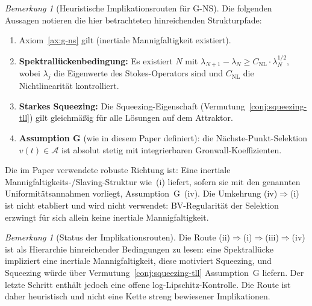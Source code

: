 \documentclass[12pt,a4paper]{article}
\theoremstyle{definition}
\theoremstyle{plain}
\theoremstyle{remark}
\newtheorem{remark}[definition]{Bemerkung}
\begin{document}
\begin{remark}[Heuristische Implikationsrouten f\"ur G-NS]\label{prop:g-equivalences}
Die folgenden Aussagen notieren die hier betrachteten hinreichenden Strukturpfade:
\begin{enumerate}
\item[(i)] Axiom~\ref{ax:g-ns} gilt (inertiale Mannigfaltigkeit existiert).
\item[(ii)] \textbf{Spektrall\"uckenbedingung:} Es existiert $N$ mit $\lambda_{N+1} - \lambda_N \geq C_{\mathrm{NL}} \cdot \lambda_N^{1/2}$, wobei $\lambda_j$ die Eigenwerte des Stokes-Operators sind und $C_{\mathrm{NL}}$ die Nichtlinearit\"at kontrolliert.
\item[(iii)] \textbf{Starkes Squeezing:} Die Squeezing-Eigenschaft (Vermutung~\ref{conj:squeezing-tll}) gilt gleichm\"a\ss ig f\"ur alle L\"osungen auf dem Attraktor.
\item[(iv)] \textbf{Assumption G} (wie in diesem Paper definiert): die N\"achste-Punkt-Selektion $v(t) \in \mathcal{A}$ ist absolut stetig mit integrierbaren Gronwall-Koeffizienten.
\end{enumerate}
Die im Paper verwendete robuste Richtung ist: Eine inertiale Mannigfaltigkeits-/Slaving-Struktur wie~(i) liefert, sofern sie mit den genannten Uniformit\"atsannahmen vorliegt, Assumption~G~(iv). Die Umkehrung (iv)$\Rightarrow$(i) ist nicht etabliert und wird nicht verwendet: BV-Regularit\"at der Selektion erzwingt f\"ur sich allein keine inertiale Mannigfaltigkeit.
\end{remark}

\begin{remark}[Status der Implikationsrouten]
\label{rem:iv-implies-i-status}
Die Route \textup{(ii)$\Rightarrow$(i)$\Rightarrow$(iii)$\Rightarrow$(iv)}
ist als Hierarchie hinreichender Bedingungen zu lesen: eine Spektrallücke
impliziert eine inertiale Mannigfaltigkeit, diese motiviert Squeezing, und
Squeezing würde über Vermutung~\ref{conj:squeezing-tll} Assumption~G liefern.
Der letzte Schritt enthält jedoch eine offene log-Lipschitz-Kontrolle.
Die Route ist daher heuristisch und nicht eine Kette streng bewiesener
Implikationen.
\end{remark}
\end{document}
